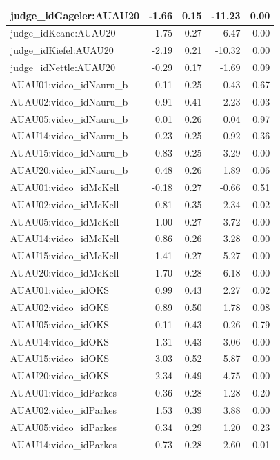 \documentclass{monashthesis}
\begin{document}
\begin{tabular}{l|r|r|r|r}
\hline
judge\_idGageler:AUAU20 & -1.66 & 0.15 & -11.23 & 0.00\\
\hline
judge\_idKeane:AUAU20 & 1.75 & 0.27 & 6.47 & 0.00\\
\hline
judge\_idKiefel:AUAU20 & -2.19 & 0.21 & -10.32 & 0.00\\
\hline
judge\_idNettle:AUAU20 & -0.29 & 0.17 & -1.69 & 0.09\\
\hline
AUAU01:video\_idNauru\_b & -0.11 & 0.25 & -0.43 & 0.67\\
\hline
AUAU02:video\_idNauru\_b & 0.91 & 0.41 & 2.23 & 0.03\\
\hline
AUAU05:video\_idNauru\_b & 0.01 & 0.26 & 0.04 & 0.97\\
\hline
AUAU14:video\_idNauru\_b & 0.23 & 0.25 & 0.92 & 0.36\\
\hline
AUAU15:video\_idNauru\_b & 0.83 & 0.25 & 3.29 & 0.00\\
\hline
AUAU20:video\_idNauru\_b & 0.48 & 0.26 & 1.89 & 0.06\\
\hline
AUAU01:video\_idMcKell & -0.18 & 0.27 & -0.66 & 0.51\\
\hline
AUAU02:video\_idMcKell & 0.81 & 0.35 & 2.34 & 0.02\\
\hline
AUAU05:video\_idMcKell & 1.00 & 0.27 & 3.72 & 0.00\\
\hline
AUAU14:video\_idMcKell & 0.86 & 0.26 & 3.28 & 0.00\\
\hline
AUAU15:video\_idMcKell & 1.41 & 0.27 & 5.27 & 0.00\\
\hline
AUAU20:video\_idMcKell & 1.70 & 0.28 & 6.18 & 0.00\\
\hline
AUAU01:video\_idOKS & 0.99 & 0.43 & 2.27 & 0.02\\
\hline
AUAU02:video\_idOKS & 0.89 & 0.50 & 1.78 & 0.08\\
\hline
AUAU05:video\_idOKS & -0.11 & 0.43 & -0.26 & 0.79\\
\hline
AUAU14:video\_idOKS & 1.31 & 0.43 & 3.06 & 0.00\\
\hline
AUAU15:video\_idOKS & 3.03 & 0.52 & 5.87 & 0.00\\
\hline
AUAU20:video\_idOKS & 2.34 & 0.49 & 4.75 & 0.00\\
\hline
AUAU01:video\_idParkes & 0.36 & 0.28 & 1.28 & 0.20\\
\hline
AUAU02:video\_idParkes & 1.53 & 0.39 & 3.88 & 0.00\\
\hline
AUAU05:video\_idParkes & 0.34 & 0.29 & 1.20 & 0.23\\
\hline
AUAU14:video\_idParkes & 0.73 & 0.28 & 2.60 & 0.01\\

\end{tabular}
\end{document}

